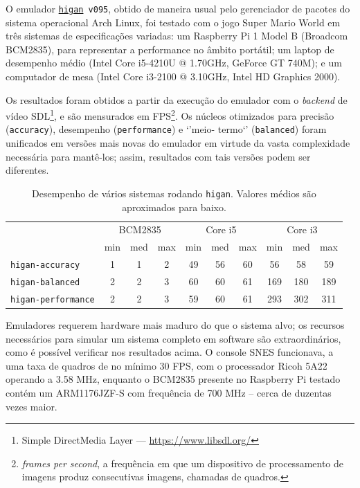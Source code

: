 \documentclass[12pt]{article}
\begin{document}
O emulador \texttt{\href{http://byuu.org/emulation/higan/}{higan} v095}, obtido
de maneira usual pelo gerenciador de pacotes do sistema operacional Arch Linux,
foi testado com o jogo Super Mario World em três sistemas de especificações
variadas: um Raspberry Pi 1 Model B (Broadcom BCM2835), para representar a
performance no âmbito portátil; um laptop de desempenho médio (Intel Core
i5-4210U @ 1.70GHz, GeForce GT 740M); e um computador de mesa (Intel Core
i3-2100 @ 3.10GHz, Intel HD Graphics 2000).

Os resultados foram obtidos a partir da execução do emulador com o
\emph{backend} de vídeo SDL\footnote{Simple DirectMedia Layer ---
\url{https://www.libsdl.org/}}, e são mensurados em FPS\footnote{\emph{frames
per second}, a frequência em que um dispositivo de processamento de imagens
produz consecutivas imagens, chamadas de quadros.}. Os núcleos otimizados para
precisão (\texttt{accuracy}), desempenho (\texttt{performance}) e `'meio-
termo`' (\texttt{balanced}) foram unificados em versões mais novas do emulador
em virtude da vasta complexidade necessária para mantê-los; assim, resultados
com tais versões podem ser diferentes.

\begin{table}[ht]
\centering
\begin{tabular}{|l|ccc|ccc|ccc|}
\hline
& \multicolumn{3}{c|}{BCM2835} & \multicolumn{3}{c|}{Core i5} & \multicolumn{3}{c|}{Core i3} \\
                            & min & med & max & min & med & max & min & med & max \\ \hline
\texttt{higan-accuracy}     & 1   & 1   & 2   & 49  & 56  & 60  & 56  & 58  & 59  \\ \hline
\texttt{higan-balanced}     & 2   & 2   & 3   & 60  & 60  & 61  & 169 & 180 & 189 \\ \hline
\texttt{higan-performance}  & 2   & 2   & 3   & 59  & 60  & 61  & 293 & 302 & 311 \\ \hline
\end{tabular}
\caption{Desempenho de vários sistemas rodando \texttt{higan}. Valores médios
são aproximados para baixo.}
\end{table}

Emuladores requerem hardware mais maduro do que o sistema alvo; os recursos
necessários para simular um sistema completo em software são extraordinários,
como é possível verificar nos resultados acima. O console SNES funcionava, a uma
taxa de quadros de no mínimo 30 FPS, com o processador Ricoh 5A22 operando a
3.58 MHz, enquanto o BCM2835 presente no Raspberry Pi testado contém um
ARM1176JZF-S com frequência de 700 MHz -- cerca de duzentas vezes maior.
\end{document}
